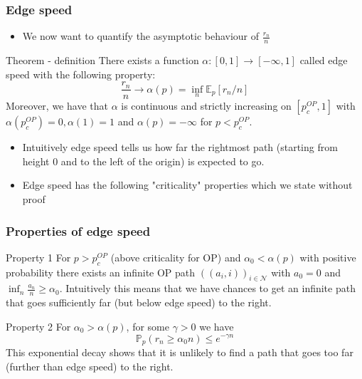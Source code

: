 \begin{frame}
	\frametitle{Edge speed}
	\begin{itemize}
		\item We now want to quantify the asymptotic behaviour of $\frac{r_{n}}{n}$
	\end{itemize}
	\begin{block}{Theorem - definition}
		There exists a function $\alpha: [0, 1] \rightarrow [- \infty, 1]$ called edge speed with the following property:
		$$
			\frac{r_{n}}{n} \rightarrow \alpha (p) = \inf_{n} \mathbb{E}_{p}[r_{n}/n]
		$$
		Moreover, we have that $\alpha$ is continuous and strictly increasing on $[p_{c}^{OP}, 1]$ with $\alpha(p_{c}^{OP}) = 0, \alpha(1) = 1$ and $\alpha(p) = -\infty$ for $p < p_{c}^{OP}$.
	\end{block}
	\begin{itemize}
		\item Intuitively edge speed tells us how far the rightmost path (starting from height 0 and to the left of the origin) is expected to go.
		\item Edge speed has the following "criticality" properties which we state without proof
	\end{itemize}

\end{frame}

\begin{frame}
	\frametitle{Properties of edge speed}
	\begin{block}{Property 1}
		For $p > p_{c}^{OP}$ (above criticality for OP) and $\alpha_{0} < \alpha(p)$ with positive probability there exists an infinite OP path $((a_{i}, i))_{i \in \mathcal{N}}$ with $a_{0} = 0$ and $\inf_{n} \frac{a_{n}}{n} \geq \alpha_{0}$. Intuitively this means that we have chances to get an infinite path that goes sufficiently far (but below edge speed) to the right.
	\end{block}

	\begin{block}{Property 2}
		For $\alpha_{0} > \alpha(p)$, for some $\gamma > 0$ we have 
		$$
			\mathbb{P}_{p}(r_{n} \geq \alpha_{0} n) \leq e^{-\gamma n}
		$$
		This exponential decay shows that it is unlikely to find a path that goes too far (further than edge speed) to the right.	
	\end{block}
\end{frame}

